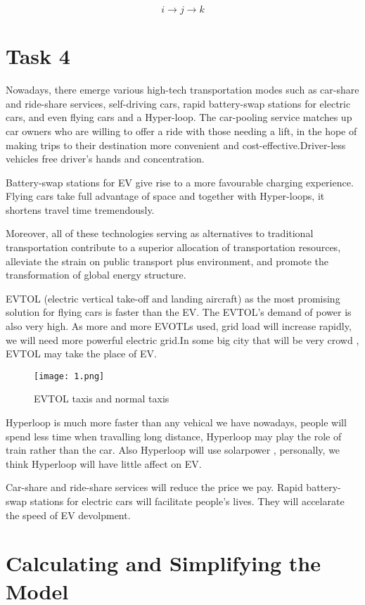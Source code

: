 \documentclass{mcmthesis}
\begin{document}
\[
i\rightarrow j\rightarrow k
\]

\section{Task 4}

Nowadays, there emerge various high-tech transportation modes such as car-share and ride-share services, self-driving cars, rapid battery-swap stations for electric cars, and even flying cars and a Hyper-loop. The car-pooling service matches up car owners who are willing to offer a ride with those needing a lift, in the hope of making trips to their destination more convenient and cost-effective.Driver-less vehicles free driver’s hands and concentration.

Battery-swap stations for EV give rise to a more favourable charging experience. Flying cars take full advantage of space and together with Hyper-loops, it shortens travel time tremendously. 

Moreover, all of these technologies serving as alternatives to traditional transportation contribute to a superior allocation of transportation resources, alleviate the strain on public transport plus environment, and promote the transformation of global energy structure.

EVTOL (electric vertical take-off and landing aircraft) as the most promising solution for flying cars is faster than the EV. The EVTOL's demand of power is also very high. As more and more EVOTLs used, grid load will increase rapidly, we will need more powerful electric grid.In some big city that will be very crowd , EVTOL may take the place of EV.

\begin{figure}[htbp]
\small
\centering
\texttt{[image: 1.png]}
\caption{EVTOL taxis and normal taxis} 
\end{figure}

Hyperloop is much more faster than any vehical we have nowadays, people will spend less time when travalling long distance, Hyperloop may play the role of train rather than the car. Also Hyperloop will use solarpower , personally, we think Hyperloop will have little affect on EV.

Car-share and ride-share services will reduce the price we pay. Rapid battery-swap stations for electric cars will facilitate people's lives. They will accelarate the speed of EV devolpment.

\section{Calculating and Simplifying the Model  }
\end{document}
